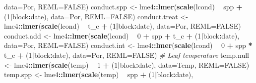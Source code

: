 \documentclass[]{scrartcl}
\newenvironment{Shaded}{\begin{snugshade}}{\end{snugshade}}
\newcommand{\CommentTok}[1]{\textcolor[rgb]{0.56,0.35,0.01}{\textit{#1}}}
\newcommand{\DataTypeTok}[1]{\textcolor[rgb]{0.13,0.29,0.53}{#1}}
\newcommand{\DecValTok}[1]{\textcolor[rgb]{0.00,0.00,0.81}{#1}}
\newcommand{\KeywordTok}[1]{\textcolor[rgb]{0.13,0.29,0.53}{\textbf{#1}}}
\newcommand{\NormalTok}[1]{#1}
\newcommand{\OperatorTok}[1]{\textcolor[rgb]{0.81,0.36,0.00}{\textbf{#1}}}
\newcommand{\OtherTok}[1]{\textcolor[rgb]{0.56,0.35,0.01}{#1}}
\newcommand{\StringTok}[1]{\textcolor[rgb]{0.31,0.60,0.02}{#1}}
\begin{document}
\begin{Shaded}
\begin{Highlighting}[]
{{{{{{{{{{{{                               \DataTypeTok{data=}\NormalTok{Por, }\DataTypeTok{REML=}\OtherTok{FALSE}\NormalTok{)}
\NormalTok{    conduct.spp <-}\StringTok{ }\NormalTok{lme4}\OperatorTok{::}\KeywordTok{lmer}\NormalTok{(}\KeywordTok{scale}\NormalTok{(lcond) }\OperatorTok{~}\StringTok{ }\NormalTok{spp }\OperatorTok{+}\StringTok{ }\NormalTok{(}\DecValTok{1}\OperatorTok{|}\NormalTok{block}\OperatorTok{:}\NormalTok{date), }
                              \DataTypeTok{data=}\NormalTok{Por, }\DataTypeTok{REML=}\OtherTok{FALSE}\NormalTok{)}
\NormalTok{    conduct.treat <-}\StringTok{ }\NormalTok{lme4}\OperatorTok{::}\KeywordTok{lmer}\NormalTok{(}\KeywordTok{scale}\NormalTok{(lcond) }\OperatorTok{~}\StringTok{ }\NormalTok{t_c }\OperatorTok{+}\StringTok{ }\NormalTok{(}\DecValTok{1}\OperatorTok{|}\NormalTok{block}\OperatorTok{:}\NormalTok{date), }
                                \DataTypeTok{data=}\NormalTok{Por, }\DataTypeTok{REML=}\OtherTok{FALSE}\NormalTok{)}
\NormalTok{    conduct.add <-}\StringTok{ }\NormalTok{lme4}\OperatorTok{::}\KeywordTok{lmer}\NormalTok{(}\KeywordTok{scale}\NormalTok{(lcond) }\OperatorTok{~}\StringTok{ }\DecValTok{0} \OperatorTok{+}\StringTok{ }\NormalTok{spp }\OperatorTok{+}\StringTok{ }\NormalTok{t_c }\OperatorTok{+}\StringTok{ }\NormalTok{(}\DecValTok{1}\OperatorTok{|}\NormalTok{block}\OperatorTok{:}\NormalTok{date), }
                              \DataTypeTok{data=}\NormalTok{Por, }\DataTypeTok{REML=}\OtherTok{FALSE}\NormalTok{)}
\NormalTok{    conduct.int <-}\StringTok{ }\NormalTok{lme4}\OperatorTok{::}\KeywordTok{lmer}\NormalTok{(}\KeywordTok{scale}\NormalTok{(lcond) }\OperatorTok{~}\StringTok{ }\DecValTok{0} \OperatorTok{+}\StringTok{ }\NormalTok{spp }\OperatorTok{*}\StringTok{ }\NormalTok{t_c  }\OperatorTok{+}\StringTok{ }\NormalTok{(}\DecValTok{1}\OperatorTok{|}\NormalTok{block}\OperatorTok{:}\NormalTok{date), }
                              \DataTypeTok{data=}\NormalTok{Por, }\DataTypeTok{REML=}\OtherTok{FALSE}\NormalTok{)}
  \CommentTok{# Leaf temperature}
\NormalTok{    temp.null <-}\StringTok{ }\NormalTok{lme4}\OperatorTok{::}\KeywordTok{lmer}\NormalTok{(}\KeywordTok{scale}\NormalTok{(temp) }\OperatorTok{~}\StringTok{ }\DecValTok{1} \OperatorTok{+}\StringTok{ }\NormalTok{(}\DecValTok{1}\OperatorTok{|}\NormalTok{block}\OperatorTok{:}\NormalTok{date),}
                               \DataTypeTok{data=}\NormalTok{Temp, }\DataTypeTok{REML=}\OtherTok{FALSE}\NormalTok{)}
\NormalTok{    temp.spp <-}\StringTok{ }\NormalTok{lme4}\OperatorTok{::}\KeywordTok{lmer}\NormalTok{(}\KeywordTok{scale}\NormalTok{(temp) }\OperatorTok{~}\StringTok{ }\NormalTok{spp }\OperatorTok{+}\StringTok{ }\NormalTok{(}\DecValTok{1}\OperatorTok{|}\NormalTok{block}\OperatorTok{:}\NormalTok{date), }
}}}}}}}}}}}}
\end{Highlighting}
\end{Shaded}
\end{document}
